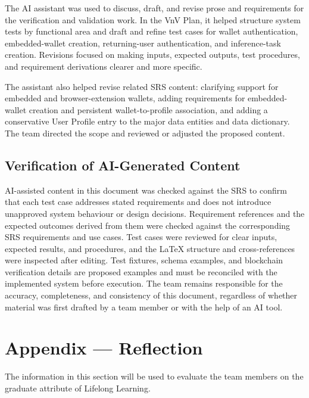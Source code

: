 \documentclass[12pt]{article}
\begin{document}
The AI assistant was used to discuss, draft, and revise prose and requirements
for the verification and validation work. In the VnV Plan, it helped structure
system tests by functional area and draft and refine test cases for wallet
authentication, embedded-wallet creation, returning-user authentication, and
inference-task creation. Revisions focused on making inputs, expected outputs,
test procedures, and requirement derivations clearer and more specific.

The assistant also helped revise related SRS content: clarifying support for
embedded and browser-extension wallets, adding requirements for embedded-wallet
creation and persistent wallet-to-profile association, and adding a
conservative User Profile entry to the major data entities and data
dictionary. The team directed the scope and reviewed or adjusted the proposed
content.

\subsection{Verification of AI-Generated Content}

AI-assisted content in this document was checked against the SRS to confirm
that each test case addresses stated requirements and does not introduce
unapproved system behaviour or design decisions. Requirement references and
the expected outcomes derived from them were checked against the corresponding
SRS requirements and use cases. Test cases were reviewed for clear inputs,
expected results, and procedures, and the LaTeX structure and cross-references
were inspected after editing. Test fixtures, schema examples, and blockchain
verification details are proposed examples and must be reconciled with the
implemented system before execution. The team remains responsible for the
accuracy, completeness, and consistency of this document, regardless of
whether material was first drafted by a team member or with the help of an AI
tool.

\newpage{}

\section{Appendix --- Reflection}


The information in this section will be used to evaluate the team members on the
graduate attribute of Lifelong Learning.


\end{document}
